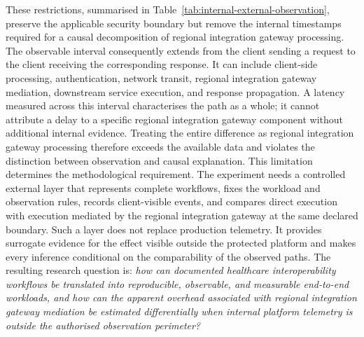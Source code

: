 \noindent These restrictions, summarised in
Table~\ref{tab:internal-external-observation}, preserve the applicable security boundary but
remove the internal timestamps required for a causal decomposition of regional integration gateway
processing. The observable interval consequently extends from the client sending a request
to the client receiving the corresponding response. It can include client-side
processing, authentication, network transit, regional integration gateway mediation, downstream
service execution, and response propagation. A latency measured across this
interval characterises the path as a whole; it cannot attribute a delay to a
specific regional integration gateway component without additional internal evidence. Treating the
entire difference as regional integration gateway processing therefore exceeds the available
data and violates the distinction between observation and causal explanation. This limitation determines the methodological requirement. The experiment needs
a controlled external layer that represents complete workflows, fixes the
workload and observation rules, records client-visible events, and compares
direct execution with execution mediated by the regional integration gateway at the same declared boundary. Such a
layer does not replace production telemetry. It provides surrogate evidence for
the effect visible outside the protected platform and makes every inference
conditional on the comparability of the observed paths. The resulting research
question is: \emph{how can documented healthcare interoperability workflows be
translated into reproducible, observable, and measurable end-to-end workloads,
and how can the apparent overhead associated with regional integration gateway mediation be estimated
differentially when internal platform telemetry is outside the authorised
observation perimeter?}

